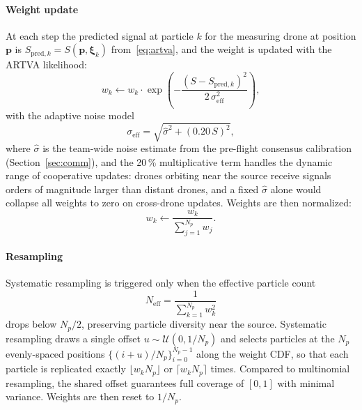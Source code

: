\documentclass[journal,10pt,twocolumn]{IEEEtran}
\begin{document}
\paragraph{Weight update}
At each step the predicted signal at particle $k$ for the measuring
drone at position $\mathbf{p}$ is
$S_{\text{pred},k} = S(\mathbf{p}, \bm{\xi}_k)$ from~\eqref{eq:artva},
and the weight is updated with the ARTVA likelihood:
\begin{equation}
  w_k \leftarrow w_k \cdot \exp\!\left(
    -\frac{(S - S_{\text{pred},k})^2}{2\,\sigma_{\text{eff}}^2}
  \right),
  \label{eq:weight}
\end{equation}
with the adaptive noise model
\begin{equation}
  \sigma_{\text{eff}} = \sqrt{\hat{\sigma}^2 + (0.20\,S)^2},
  \label{eq:sigma_eff}
\end{equation}
where $\hat{\sigma}$ is the team-wide noise estimate from the
pre-flight consensus calibration (Section~\ref{sec:comm}), and the
20\,\% multiplicative term handles the dynamic range of cooperative
updates: drones orbiting near the source receive signals orders of
magnitude larger than distant drones, and a fixed $\hat{\sigma}$
alone would collapse all weights to zero on cross-drone updates.  Weights are
then normalized:
\begin{equation}
  w_k \leftarrow \frac{w_k}{\sum_{j=1}^{N_p} w_j}.
  \label{eq:pf_norm}
\end{equation}

\paragraph{Resampling}
Systematic resampling is triggered only when the effective particle count
\begin{equation}
  N_{\text{eff}} = \frac{1}{\sum_{k=1}^{N_p} w_k^2}
  \label{eq:neff}
\end{equation}
drops below $N_p/2$, preserving particle diversity near the source.
Systematic resampling draws a single offset $u \sim \mathcal{U}(0,
1/N_p)$ and selects particles at the $N_p$ evenly-spaced positions
$\{(i + u)/N_p\}_{i=0}^{N_p-1}$ along the weight CDF, so that each
particle is replicated exactly $\lfloor w_k N_p \rfloor$ or $\lceil
w_k N_p \rceil$ times.  Compared to multinomial resampling, the shared
offset guarantees full coverage of $[0,1]$ with minimal variance.
Weights are then reset to $1/N_p$.
\end{document}
